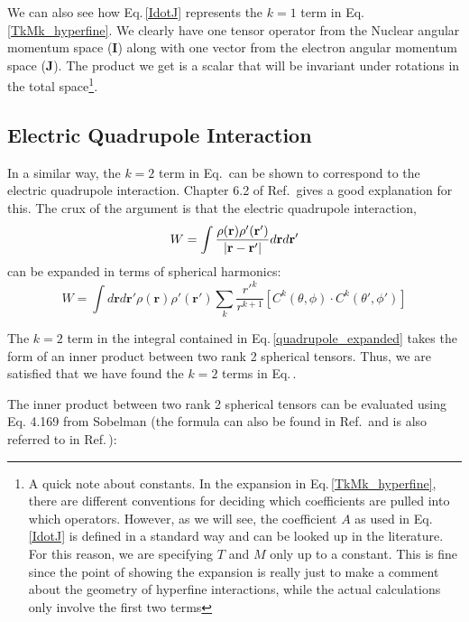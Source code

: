 We can also see how Eq.\,\ref{IdotJ} represents the $k=1$ term in Eq.\,\ref{TkMk_hyperfine}. We clearly have one tensor operator from the Nuclear angular momentum space ($\mathbf{I}$) along with one vector from the electron angular momentum space ($\mathbf{J}$). The product we get is a scalar that will be invariant under rotations in the total space\footnote{A quick note about constants. In the expansion in Eq.\,\ref{TkMk_hyperfine}, there are different conventions \cite{schwartz_hyperfine_expansion} for deciding which coefficients are pulled into which operators. However, as we will see, the coefficient $A$ as used in Eq.\,\ref{IdotJ} is defined in a standard way and can be looked up in the literature. For this reason, we are specifying $T$ and $M$ only up to a constant. This is fine since the point of showing the expansion is really just to make a comment about the geometry of hyperfine interactions, while the actual calculations only involve the first two terms}.

\subsection{Electric Quadrupole Interaction}
In a similar way, the $k=2$ term in Eq.\,\label{TkMk_hyperfine} can be shown to correspond to the electric quadrupole interaction. Chapter 6.2 of Ref.\,\cite{sobelman_spectra} gives a good explanation for this. The crux of the argument is that the electric quadrupole interaction,
\begin{equation}
W=\int\frac{\rho(\mathbf{r})\rho'(\mathbf{r}')}{|\mathbf{r}-\mathbf{r}'|}d\mathbf{r}d\mathbf{r'}\\
\end{equation}
can  be expanded in terms of spherical harmonics: 
\begin{equation}
W=\int d\mathbf{r}d\mathbf{r'}
\rho(\mathbf{r})\rho'(\mathbf{r}')\sum_k \frac{r'^k}{r^{k+1}}[C^k(\theta,\phi)\cdot C^k(\theta',\phi')] \label{quadrupole_expanded}
\end{equation}

The $k=2$ term in the integral contained in Eq.\,\ref{quadrupole_expanded} takes the form of an inner product between two rank 2 spherical tensors. Thus, we are satisfied that we have found the $k=2$ terms in Eq.\,\cite{TkMk_hyperfine}.

The inner product between two rank 2 spherical tensors can be evaluated using Eq. 4.169 from Sobelman \cite{sobelman_spectra} (the formula can also be found in Ref.\,\cite{Racah2} and is also referred to in Ref.\,\cite{schwartz_hyperfine_expansion}):

